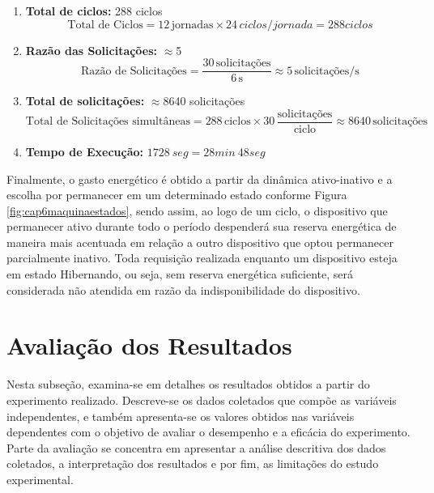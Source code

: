 \begin{enumerate}
	
	\item \textbf{Total de ciclos:} 288 ciclos
	\[
	\text{Total de Ciclos} = 12 \, \text{jornadas} \times 24 \, ciclos/jornada = 288 ciclos
	\]
	\item \textbf{Razão das Solicitações:} $\approx$5 \, 
	\[
	\text{Razão de Solicitações} = \frac{30 \, \text{solicitações}}{6 \, \text{s}} \approx 5 \, \text{solicitações/s}
	\]
	\item \textbf{Total de solicitações:} $\approx$8640 solicitações
	\[
	\text{Total de Solicitações simultâneas} = 288 \, \text{ciclos} \times 30 \, \frac{\text{solicitações}}{\text{ciclo}} \approx 8640 \, \text{solicitações}
	\]
	
	\item \textbf{Tempo de Execução:} $1728 \ seg = 28min \ 48seg$
	

\end{enumerate}


Finalmente, o gasto energético é obtido a partir da dinâmica ativo-inativo e a escolha por permanecer em um determinado estado conforme Figura \ref{fig:cap6maquinaestados}, sendo assim, ao logo de um ciclo, o dispositivo que permanecer ativo durante todo o período despenderá sua reserva energética de maneira mais acentuada em relação a outro dispositivo que optou permanecer parcialmente inativo. Toda requisição realizada enquanto um dispositivo esteja em estado Hibernando, ou seja, sem reserva energética suficiente, será considerada não atendida em razão da indisponibilidade do dispositivo.




\section{Avaliação dos Resultados}
\label{cap6:avaliacao}



Nesta subseção, examina-se em detalhes os resultados obtidos a partir do experimento realizado. Descreve-se os dados coletados que compõe as variáveis independentes, e também apresenta-se os valores obtidos nas variáveis dependentes com o objetivo de avaliar o desempenho e a eficácia do experimento. 
Parte da avaliação se concentra em apresentar a análise descritiva dos dados coletados, a interpretação dos resultados e por fim, as limitações do estudo experimental.



